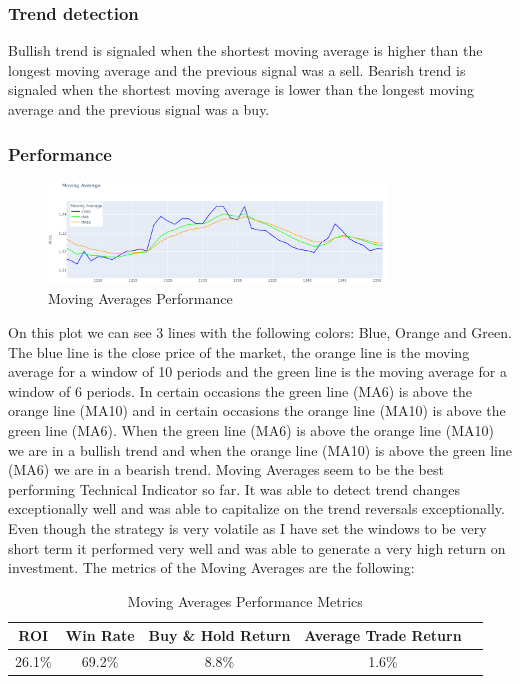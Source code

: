 \documentclass{imc-inf}
\begin{document}
			\subsubsection{Trend detection}
				Bullish trend is signaled when the shortest moving average is higher than the longest moving average and the previous signal was a sell.
				Bearish trend is signaled when the shortest moving average is lower than the longest moving average and the previous signal was a buy.

			\subsubsection{Performance}
				\begin{figure}[h!]
					\centering
					\includegraphics[width=0.8\textwidth]{moving_averages_plot.png}
					\caption{Moving Averages Performance}
					\label{fig:moving_averages_performance}
				\end{figure}
				On this plot we can see 3 lines with the following colors: Blue, Orange and Green. The blue line is the close price of the market, the orange line is the moving average for 
				a window of 10 periods and the green line is the moving average for a window of 6 periods. 
				In certain occasions the green line (MA6) is above the orange line (MA10) and in certain occasions the orange line (MA10) is above the green line (MA6).
				When the green line (MA6) is above the orange line (MA10) we are in a bullish trend and when the orange line (MA10) is above the green line (MA6) we are in a bearish trend.
				Moving Averages seem to be the best performing Technical Indicator so far. It was able to detect trend changes exceptionally well and was able 
				to capitalize on the trend reversals exceptionally. Even though the strategy is very volatile as I have set the windows to be very short term it performed 
				very well and was able to generate a very high return on investment.
				The metrics of the Moving Averages are the following:
				\begin{table}[h!]
					\centering
					\begin{tabular}{|c|c|c|c|c|}
						\hline
						\textbf{ROI} & \textbf{Win Rate} & \textbf{Buy \& Hold Return} & \textbf{Average Trade Return} \\ \hline
						26.1\%         & 69.2\%               & 8.8\%                         & 1.6\%                           \\ \hline
					\end{tabular}
					\caption{Moving Averages Performance Metrics}
					\label{tab:moving_averages_performance_metrics}
				
				\end{table}
\end{document}
